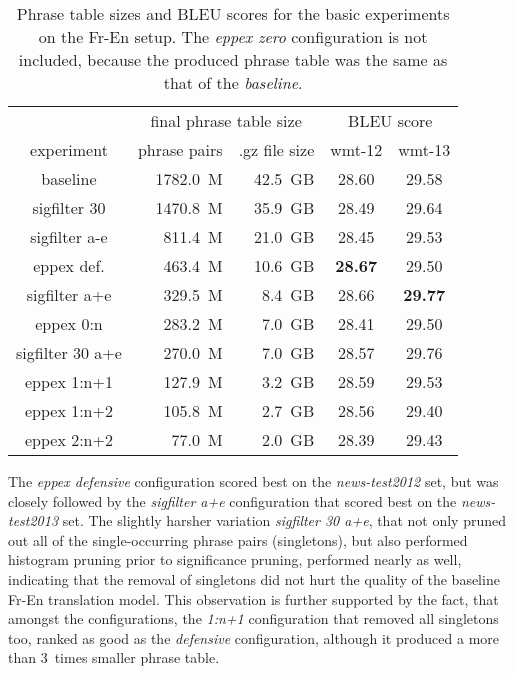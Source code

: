 \begin{table}[ht]
\centering
\begin{tabular}{ | c | r r | c c | }
\hline
 & \multicolumn{2}{|c|}{final phrase table size} & \multicolumn{2}{|c|}{BLEU score} \\
experiment & phrase pairs & .gz file size & wmt-12 & wmt-13 \\
\hline
\hline
baseline          & 1782.0~M & 42.5~GB & 28.60 & 29.58 \\
sigfilter 30      & 1470.8~M & 35.9~GB & 28.49 & 29.64 \\
sigfilter a-e     &  811.4~M & 21.0~GB & 28.45 & 29.53 \\
eppex def.        &  463.4~M & 10.6~GB & \textbf{28.67} & 29.50 \\
sigfilter a+e     &  329.5~M &  8.4~GB & 28.66 & \textbf{29.77} \\
eppex 0:n         &  283.2~M &  7.0~GB & 28.41 & 29.50 \\
sigfilter 30 a+e  &  270.0~M &  7.0~GB & 28.57 & 29.76 \\
eppex 1:n+1       &  127.9~M &  3.2~GB & 28.59 & 29.53 \\
eppex 1:n+2       &  105.8~M &  2.7~GB & 28.56 & 29.40 \\
eppex 2:n+2       &   77.0~M &  2.0~GB & 28.39 & 29.43 \\
\hline
\end{tabular}
\caption{\label{fr-en-pt-size-and-bleu}
Phrase table sizes and BLEU scores for the basic experiments on the Fr-En setup.
The \emph{eppex zero} configuration is not included, because the produced phrase table
was the same as that of the \emph{baseline}.}
\end{table}

The \emph{eppex defensive} configuration scored best on the \emph{news-test2012} set,
but was closely followed by the \emph{sigfilter a+e} configuration that scored best on
the \emph{news-test2013} set.
The slightly harsher variation \emph{sigfilter 30 a+e}, that not only pruned out
all of the single-occurring phrase pairs (singletons), but also performed histogram pruning prior to
significance pruning, performed nearly as well, indicating that the removal of
singletons did not hurt the quality of the baseline Fr-En translation model.
This observation is further supported by the fact, that amongst the \eppex{} configurations,
the \emph{1:n+1} configuration that removed all singletons too, ranked as good as
the \emph{defensive} configuration, although it produced a more than 3~times smaller phrase table.

